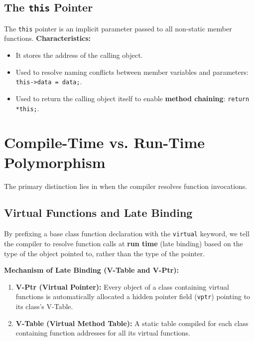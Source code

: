 \documentclass[12pt,a4paper]{article}
\begin{document}
\subsection{The \texorpdfstring{\texttt{this}}{this} Pointer}
The \texttt{this} pointer is an implicit parameter passed to all non-static member functions.
\textbf{Characteristics:}
\begin{itemize}[leftmargin=*, itemsep=2pt]
  \item It stores the address of the calling object.
  \item Used to resolve naming conflicts between member variables and parameters: \texttt{this->data = data;}.
  \item Used to return the calling object itself to enable \textbf{method chaining}: \texttt{return *this;}.
\end{itemize}

\section{Compile-Time vs. Run-Time Polymorphism}

The primary distinction lies in when the compiler resolves function invocations.

\subsection{Virtual Functions and Late Binding}
By prefixing a base class function declaration with the \texttt{virtual} keyword, we tell the compiler to resolve function calls at \textbf{run time} (late binding) based on the type of the object pointed to, rather than the type of the pointer.

\textbf{Mechanism of Late Binding (V-Table and V-Ptr):}
\begin{enumerate}[label=\textbf{\arabic*.}, leftmargin=*, itemsep=2.5pt]
  \item \textbf{V-Ptr (Virtual Pointer):} Every object of a class containing virtual functions is automatically allocated a hidden pointer field (\texttt{vptr}) pointing to its class's V-Table.
  \item \textbf{V-Table (Virtual Method Table):} A static table compiled for each class containing function addresses for all its virtual functions.
\end{enumerate}
\end{document}
